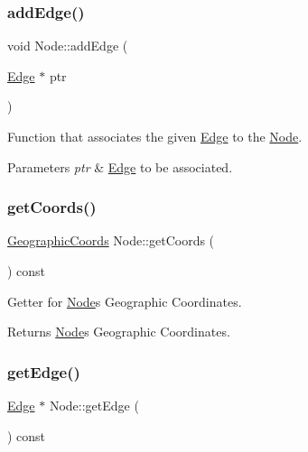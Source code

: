 \subsubsection{\texorpdfstring{add\+Edge()}{addEdge()}}
{\footnotesize\ttfamily void Node\+::add\+Edge (\begin{DoxyParamCaption}\item[{\hyperlink{class_edge}{Edge} $\ast$}]{ptr }\end{DoxyParamCaption})}

Function that associates the given \hyperlink{class_edge}{Edge} to the \hyperlink{class_node}{Node}.


\begin{DoxyParams}{Parameters}
{\em ptr} & \hyperlink{class_edge}{Edge} to be associated. \\
\hline
\end{DoxyParams}
\hypertarget{class_node_a77aeb1b8ddb7776e097f5ad8a56bd0d0}{}\label{class_node_a77aeb1b8ddb7776e097f5ad8a56bd0d0} 
\subsubsection{\texorpdfstring{get\+Coords()}{getCoords()}}
{\footnotesize\ttfamily \hyperlink{class_geographic_coords}{Geographic\+Coords} Node\+::get\+Coords (\begin{DoxyParamCaption}{ }\end{DoxyParamCaption}) const}

Getter for \hyperlink{class_node}{Node}\textquotesingle{}s Geographic Coordinates.

\begin{DoxyReturn}{Returns}
\hyperlink{class_node}{Node}\textquotesingle{}s Geographic Coordinates. 
\end{DoxyReturn}
\hypertarget{class_node_a108b79d820efdc2768a148e9308b3c31}{}\label{class_node_a108b79d820efdc2768a148e9308b3c31} 
\subsubsection{\texorpdfstring{get\+Edge()}{getEdge()}\hspace{0.1cm}{\footnotesize\ttfamily [1/2]}}
{\footnotesize\ttfamily \hyperlink{class_edge}{Edge} $\ast$ Node\+::get\+Edge (\begin{DoxyParamCaption}{ }\end{DoxyParamCaption}) const}

